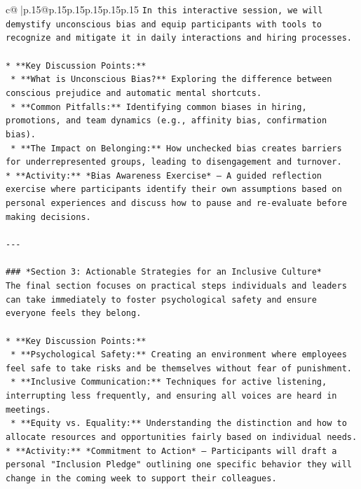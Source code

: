 \documentclass{article}
\begin{document}
{\begin{supertabular}{c@{$\;$}|p{.15\linewidth}@{}p{.15\linewidth}p{.15\linewidth}p{.15\linewidth}p{.15\linewidth}p{.15\linewidth}}
{{{\texttt{In this interactive session, we will demystify unconscious bias and equip participants with tools to recognize and mitigate it in daily interactions and hiring processes.} \\
\\ 
\texttt{*   **Key Discussion Points:**} \\
\texttt{    *   **What is Unconscious Bias?** Exploring the difference between conscious prejudice and automatic mental shortcuts.} \\
\texttt{    *   **Common Pitfalls:** Identifying common biases in hiring, promotions, and team dynamics (e.g., affinity bias, confirmation bias).} \\
\texttt{    *   **The Impact on Belonging:** How unchecked bias creates barriers for underrepresented groups, leading to disengagement and turnover.} \\
\texttt{*   **Activity:** *Bias Awareness Exercise* – A guided reflection exercise where participants identify their own assumptions based on personal experiences and discuss how to pause and re{-}evaluate before making decisions.} \\
\\ 
\texttt{{-}{-}{-}} \\
\\ 
\texttt{\#\#\# *Section 3: Actionable Strategies for an Inclusive Culture*} \\
\texttt{The final section focuses on practical steps individuals and leaders can take immediately to foster psychological safety and ensure everyone feels they belong.} \\
\\ 
\texttt{*   **Key Discussion Points:**} \\
\texttt{    *   **Psychological Safety:** Creating an environment where employees feel safe to take risks and be themselves without fear of punishment.} \\
\texttt{    *   **Inclusive Communication:** Techniques for active listening, interrupting less frequently, and ensuring all voices are heard in meetings.} \\
\texttt{    *   **Equity vs. Equality:** Understanding the distinction and how to allocate resources and opportunities fairly based on individual needs.} \\
\texttt{*   **Activity:** *Commitment to Action* – Participants will draft a personal "Inclusion Pledge" outlining one specific behavior they will change in the coming week to support their colleagues.} \\
}}}
\end{supertabular}}
\end{document}
